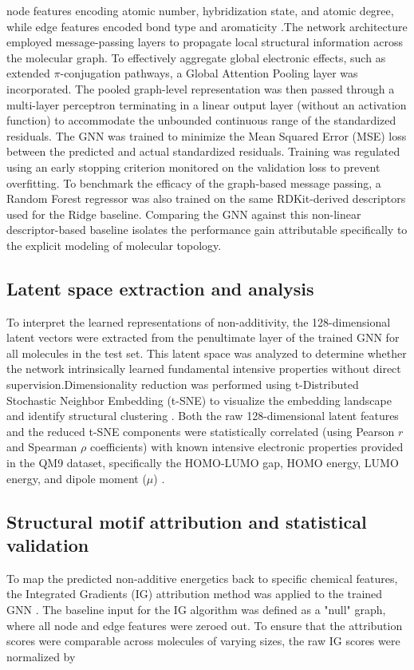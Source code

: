 \documentclass[]{article}
\begin{document}
node features encoding atomic number, hybridization state, and atomic degree, while edge features encoded bond type and aromaticity \citep{ma2020multiviewgraphneuralnetworks,nguyen2026mmgnnmultilevelmulticolorgraph}.The network architecture employed message-passing layers to propagate local structural information across the molecular graph. \citep{gilmer2017neuralmessagepassingquantum,berry2025surveygraphneuralnetworks} To effectively aggregate global electronic effects, such as extended $\pi$-conjugation pathways, a Global Attention Pooling layer was incorporated. \citep{jo2021flexibledualbranchedmessagepassing,pescia2023messagepassingneuralquantumstates} The pooled graph-level representation was then passed through a multi-layer perceptron terminating in a linear output layer (without an activation function) to accommodate the unbounded continuous range of the standardized residuals. \citep{gilmer2017neuralmessagepassingquantum,liu2026localglobalmultimodalcontrastivelearning}The GNN was trained to minimize the Mean Squared Error (MSE) loss between the predicted and actual standardized residuals. Training was regulated using an early stopping criterion monitored on the validation loss to prevent overfitting. To benchmark the efficacy of the graph-based message passing, a Random Forest regressor was also trained on the same RDKit-derived descriptors used for the Ridge baseline. Comparing the GNN against this non-linear descriptor-based baseline isolates the performance gain attributable specifically to the explicit modeling of molecular topology.\subsection{Latent space extraction and analysis}To interpret the learned representations of non-additivity, the 128-dimensional latent vectors were extracted from the penultimate layer of the trained GNN for all molecules in the test set. This latent space was analyzed to determine whether the network intrinsically learned fundamental intensive properties without direct supervision.Dimensionality reduction was performed using t-Distributed Stochastic Neighbor Embedding (t-SNE) to visualize the embedding landscape and identify structural clustering . Both the raw 128-dimensional latent features and the reduced t-SNE components were statistically correlated (using Pearson $r$ and Spearman $\rho$ coefficients) with known intensive electronic properties provided in the QM9 dataset, specifically the HOMO-LUMO gap, HOMO energy, LUMO energy, and dipole moment ($\mu$) .\subsection{Structural motif attribution and statistical validation}To map the predicted non-additive energetics back to specific chemical features, the Integrated Gradients (IG) attribution method was applied to the trained GNN \citep{ji2026molledgeradditivegraphneural}. The baseline input for the IG algorithm was defined as a "null" graph, where all node and edge features were zeroed out. To ensure that the attribution scores were comparable across molecules of varying sizes, the raw IG scores were normalized by 
\end{document}
